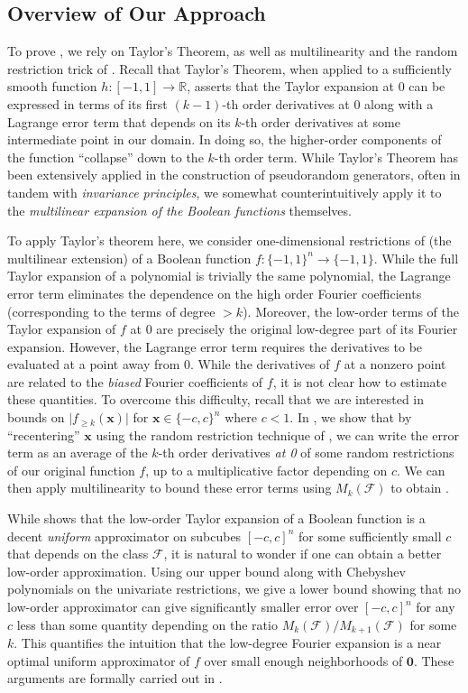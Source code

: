 \subsection{Overview of Our Approach}
{To prove , we rely on Taylor's Theorem, as well as multilinearity and the random restriction trick of \cite{CHHL}. Recall that Taylor's Theorem, when applied to a sufficiently smooth function $h\colon[-1,1]\to \mathbb{R}$, asserts that the Taylor expansion at $0$ can be expressed in terms of its first $(k-1)$-th order derivatives at $0$ along with a Lagrange error term that depends on its $k$-th order derivatives at some intermediate point in our domain.  In doing so, the higher-order components of the function ``collapse'' down to the $k$-th order term.  While Taylor's Theorem has been extensively applied in the construction of pseudorandom generators, often in tandem with \emph{invariance principles}, we somewhat counterintuitively apply it to the \emph{multilinear expansion of the Boolean functions} themselves.} 

{To apply Taylor's theorem here, we consider one-dimensional restrictions of (the multilinear extension) of a Boolean function $f\colon\{-1,1\}^n \to \{-1,1\}$. While the full Taylor expansion of a polynomial is trivially the same polynomial, the Lagrange error term  eliminates the dependence on the high order Fourier coefficients (corresponding to the terms of degree $>k$). Moreover, the low-order terms of the  Taylor expansion of $f$ at $0$
are precisely the original low-degree part of its Fourier expansion.  However, the Lagrange error term requires the derivatives to be evaluated at a point away from $0$.
While the derivatives of $f$ at a nonzero point are related to the \emph{biased} Fourier coefficients of $f$, it is not clear how to estimate these quantities.
To overcome this difficulty, recall that we are interested in bounds on $\vert f_{\geq k}(\mathbf{x})\vert$ for $\mathbf{x}\in \{-c,c\}^n$ where $c<1$.  In , we show that by ``recentering'' $\mathbf{x}$ using the random restriction technique of \cite{CHHL}, we can write the error term as an average of the $k$-th order derivatives \emph{at 0} of some random restrictions of our original function $f$, up to a multiplicative factor depending on $c$.  We can then apply multilinearity to bound these error terms using $M_k(\mathcal{F})$ to obtain .}

{While  shows that the low-order Taylor expansion of a Boolean function is a decent \emph{uniform} approximator on subcubes $[-c,c]^n$ for some sufficiently small $c$ that depends on the class $\mathcal{F}$, it is natural to wonder if one can obtain a better 
low-order approximation.  Using our upper bound along with Chebyshev polynomials on the univariate restrictions, we give a lower bound
showing that no low-order approximator can give significantly smaller error over $[-c,c]^n$ for any $c$ less than some quantity depending on the ratio $M_k(\mathcal{F})/M_{k+1}(\mathcal{F})$ for some $k$. This quantifies the intuition that the low-degree Fourier expansion is a near optimal uniform approximator of $f$ over small enough neighborhoods of $\mathbf{0}$. These arguments are formally carried out in .}


